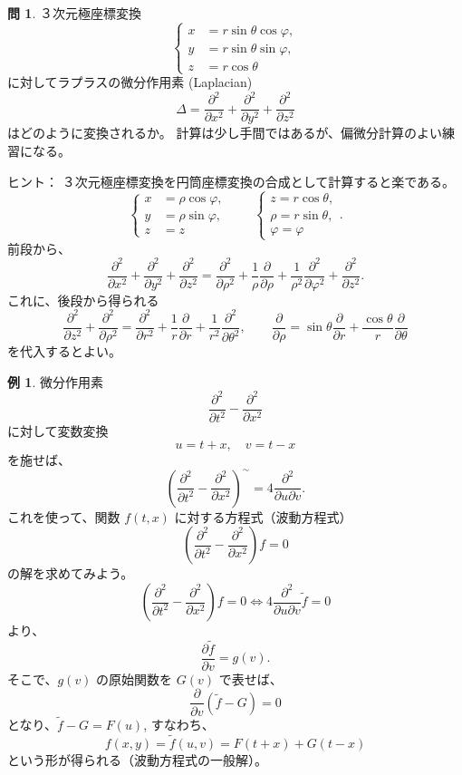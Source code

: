 \documentclass[a4paper]{jsarticle}
\theoremstyle{definition}
\newtheorem{Example}[Theorem]{例}
\newtheorem{Exercise}{問}%
\theoremstyle{remark}
\newcommand{\del}{\partial}
\begin{document}
\begin{Exercise}
３次元極座標変換
\[
\begin{cases}
x &= r\sin\theta \cos\varphi,\\
y &= r\sin\theta \sin\varphi, \\
z &= r\cos\theta
\end{cases}
\]
に対してラプラスの微分作用素 (Laplacian) 
\[
\Delta = \frac{\del^2}{\del x^2} + \frac{\del^2}{\del y^2} + \frac{\del^2}{\del z^2}
\]
はどのように変換されるか。
計算は少し手間ではあるが、偏微分計算のよい練習になる。

ヒント：
３次元極座標変換を円筒座標変換の合成として計算すると楽である。
\[
\begin{cases}
x &= \rho \cos\varphi,\\
y &= \rho \sin\varphi, \\
z &= z
\end{cases} 
\qquad 
\begin{cases}
z = r\cos\theta,\\
\rho = r\sin \theta,\\
\varphi = \varphi
\end{cases}. 
\]
前段から、
\[ 
\frac{\partial^2}{\partial x^2} + \frac{\partial^2}{\partial y^2} + \frac{\partial^2}{\partial z^2} 
= \frac{\partial^2}{\partial \rho^2} + \frac{1}{\rho}\frac{\partial}{\partial \rho} 
+ \frac{1}{\rho^2}\frac{\partial^2}{\partial \varphi^2} 
+ \frac{\partial^2}{\partial z^2}. 
\] 
これに、後段から得られる
\[ 
\frac{\partial^2}{\partial z^2} + \frac{\partial^2}{\partial \rho^2}
= \frac{\partial^2}{\partial r^2} + \frac{1}{r}\frac{\partial}{\partial r} 
+ \frac{1}{r^2}\frac{\partial^2}{\partial \theta^2}, 
\qquad 
\frac{\partial}{\partial\rho} = \sin\theta \frac{\partial}{\partial r} 
+ \frac{\cos\theta}{r} \frac{\partial}{\partial \theta} 
\]
を代入するとよい。
\end{Exercise}

\begin{Example}
微分作用素 
\[
\frac{\del^2}{\del t^2} - \frac{\del^2}{\del x^2} 
\]
に対して変数変換
\[
u = t + x,\quad v = t - x
\]
を施せば、
\[
\left(\frac{\del^2}{\del t^2} - \frac{\del^2}{\del x^2} \right)^\sim
= 4 \frac{\del^2}{\del u \del v}. 
\]
これを使って、関数 $f(t,x)$ に対する方程式（波動方程式）
\[ 
\left( \frac{\partial^2}{\partial t^2} - \frac{\partial^2}{\partial x^2} \right) f = 0 
\]
の解を求めてみよう。
\[
\left( \frac{\del^2}{\del t^2} - \frac{\del^2}{\del x^2} \right) f 
= 0 
\iff 
4 \frac{\del^2}{\del u \del v} \widetilde f = 0 
\]
より、
\[
\frac{\del \widetilde f}{\del v} = g(v).
\]
そこで、$g(v)$ の原始関数を $G(v)$ で表せば、
\[
\frac{\del}{\del v} (\widetilde f -G) = 0 
\]
となり、$\widetilde f - G = F(u)$, すなわち、
\[
f(x,y) = \widetilde f(u,v) = F(t+x) + G(t-x)
\]
という形が得られる（波動方程式の一般解）。
\end{Example}
\end{document}
